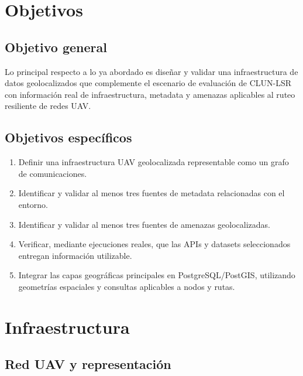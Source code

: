 \documentclass[journal,10pt]{IEEEtran}
\begin{document}
\section{Objetivos}

\subsection{Objetivo general}

Lo principal respecto a lo ya abordado es diseñar y validar una infraestructura de datos geolocalizados que complemente el escenario de
evaluación de CLUN-LSR con información real de infraestructura, metadata y amenazas aplicables al
ruteo resiliente de redes UAV.

\subsection{Objetivos específicos}

\begin{enumerate}
    \item Definir una infraestructura UAV geolocalizada representable como un grafo de
    comunicaciones.
    \item Identificar y validar al menos tres fuentes de metadata relacionadas con el entorno.
    \item Identificar y validar al menos tres fuentes de amenazas geolocalizadas.
    \item Verificar, mediante ejecuciones reales, que las APIs y datasets seleccionados entregan
    información utilizable.
    \item Integrar las capas geográficas principales en PostgreSQL/PostGIS, utilizando geometrías
    espaciales y consultas aplicables a nodos y rutas.
\end{enumerate}

\section{Infraestructura}

\subsection{Red UAV y representación}
\end{document}
